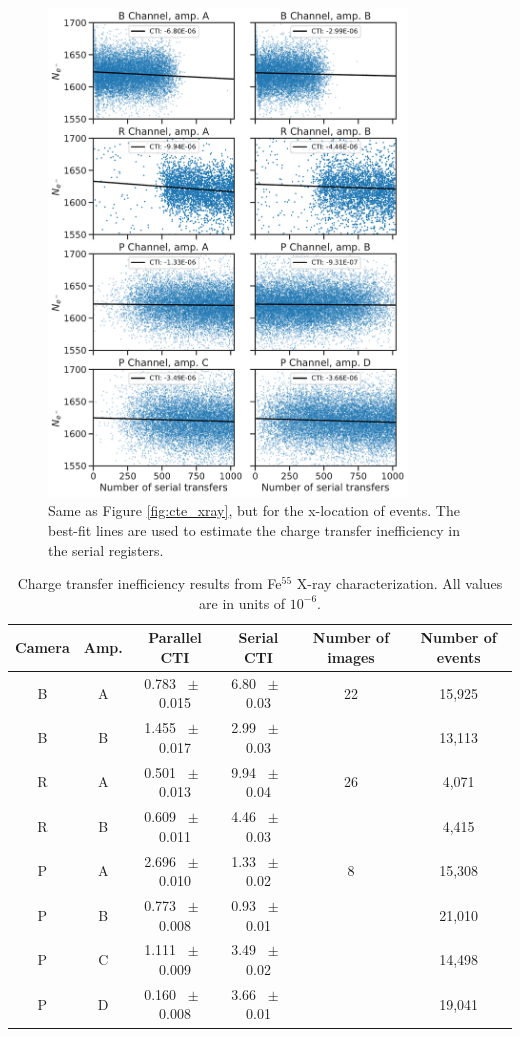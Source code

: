 \begin{figure}[htbp]
    \centering
    \includegraphics[width=0.85\textwidth]{figures/cte/xray_cte_serial.pdf}
    \caption{Same as Figure \ref{fig:cte_xray}, but for the x-location of events. The best-fit lines are used to estimate the charge transfer inefficiency in the serial registers.}
    \label{fig:cte_xray_serial}
\end{figure}

\begin{table}[htbp]
    \centering
    \begin{tabular}{cccccc}\toprule
        Camera & Amp. & Parallel CTI & Serial CTI & Number of images & Number of events \\\midrule
        B & A &0.783 $\;\pm\;$ 0.015 & 6.80 $\;\pm\;$ 0.03 & 22 & 15,925 \\
        B & B &1.455 $\;\pm\;$ 0.017 & 2.99 $\;\pm\;$ 0.03 &  & 13,113 \\\midrule
        R & A &0.501 $\;\pm\;$ 0.013 & 9.94 $\;\pm\;$ 0.04 & 26 & 4,071 \\
        R & B &0.609 $\;\pm\;$ 0.011 & 4.46 $\;\pm\;$ 0.03 &  & 4,415 \\\midrule
        P & A &2.696 $\;\pm\;$ 0.010 & 1.33 $\;\pm\;$ 0.02 & 8 & 15,308 \\
        P & B &0.773 $\;\pm\;$ 0.008 & 0.93 $\;\pm\;$ 0.01 &  & 21,010 \\
        P & C &1.111 $\;\pm\;$ 0.009 & 3.49 $\;\pm\;$ 0.02 &  & 14,498 \\
        P & D &0.160 $\;\pm\;$ 0.008 & 3.66 $\;\pm\;$ 0.01 &  & 19,041 \\
    \end{tabular}
    \caption{Charge transfer inefficiency results from Fe$^{55}$ X-ray characterization. All values are in units of $10^{-6}$.}
    \label{tab:cte_xray}
\end{table}

